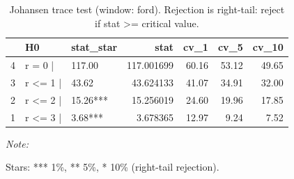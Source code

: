\begin{table}[!h]
\centering
\caption{Johansen trace test (window: ford). Rejection is right-tail: reject if stat >= critical value.}
\centering
\begin{threeparttable}
\begin{tabular}[t]{lllrrrr}
\toprule
  & H0 & stat\_star & stat & cv\_1 & cv\_5 & cv\_10\\
\midrule
4 & r = 0  | & 117.00 & 117.001699 & 60.16 & 53.12 & 49.65\\
3 & r <= 1 | & 43.62 & 43.624133 & 41.07 & 34.91 & 32.00\\
2 & r <= 2 | & 15.26*** & 15.256019 & 24.60 & 19.96 & 17.85\\
1 & r <= 3 | & 3.68*** & 3.678365 & 12.97 & 9.24 & 7.52\\
\bottomrule
\end{tabular}
\begin{tablenotes}
\item \textit{Note: } 
\item Stars: *** 1\%, ** 5\%, * 10\% (right-tail rejection).
\end{tablenotes}
\end{threeparttable}
\end{table}
